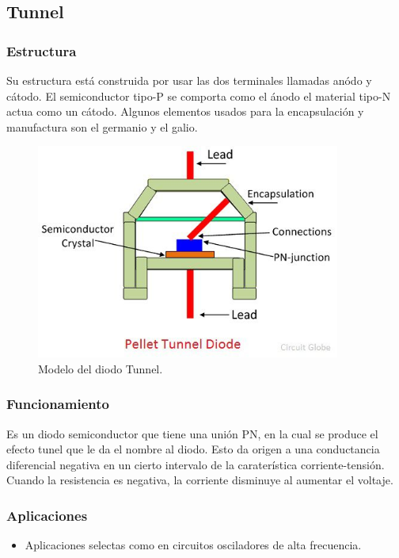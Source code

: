 \documentclass[letterpaper, 12pt]{article}
\begin{document}
\begin{justify}
        \subsection{Tunnel}
        \subsubsection{Estructura}
        Su estructura está construida por usar las dos terminales llamadas anódo y cátodo. El semiconductor tipo-P se comporta como el ánodo el material tipo-N actua como un cátodo.
        Algunos elementos usados para la encapsulación y manufactura son el germanio y el galio.
        \begin{figure}[H]
            \centering
            \includegraphics[width=10cm]{tunnel.jpg}
            \caption{Modelo del diodo Tunnel.}
            \label{fig:Dtunel}
        \end{figure}
        \subsubsection{Funcionamiento}
        Es un diodo semiconductor que tiene una unión PN, en la cual se produce el efecto tunel que le da el nombre al diodo. Esto da origen a una conductancia diferencial negativa
        en un cierto intervalo de la caraterística corriente-tensión. Cuando la resistencia es negativa, la corriente disminuye al aumentar el voltaje. 
        \subsubsection{Aplicaciones}
        \begin{itemize}
            \item Aplicaciones selectas como en circuitos osciladores de alta frecuencia.
        \end{itemize}
        

\end{justify}
\end{document}
